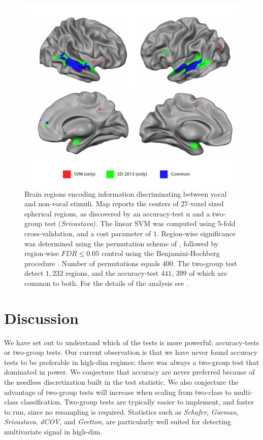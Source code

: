 \documentclass[oupdraft]{bio}
\begin{document}
\begin{figure}[th]
	\centering
	\includegraphics[width=0.5\columnwidth]{"art/svm_vs_SD"}
	\caption{\footnotesize
		Brain regions encoding information discriminating between vocal and non-vocal stimuli.
		Map reports the centers of $27$-voxel sized spherical regions, as discovered by an accuracy-test u and a two-group test (\emph{Srivastava}). 
		The linear SVM was computed using $5$-fold cross-validation, and a cost parameter of $1$. 
		Region-wise significance was determined using the permutation scheme of \cite{stelzer_statistical_2013}, followed by region-wise $FDR \leq 0.05$ control using the Benjamini-Hochberg procedure \citep{benjamini_controlling_1995}.
		Number of permutations equals $400$.
		The two-group test detect $1,232$ regions, and the accuracy-test $441$, $399$ of which are common to both.
		For the details of the analysis see \cite{gilron_quantifying_2016}.  
	}
	\label{fig:read_data}
\end{figure}








\section{Discussion}
\label{sec:discussion}

We have set out to understand which of the tests is more powerful: accuracy-tests or two-group tests. 
Our current observation is that we have never found accuracy tests to be preferable in high-dim regimes; there was always a two-group test that dominated in power.
We conjecture that accuracy are never preferred because of the needless discretization built in the test statistic.
We also conjecture the advantage of two-group tests will increase when scaling from two-class to multi-class classification.
Two-group tests are typically easier to implement, and faster to run, since no resampling is required. 
Statistics such as \emph{Schafer}, \emph{Goeman}, \emph{Srivastava}, \emph{dCOV}, and \emph{Gretton}, are particularly well suited for detecting multivariate signal in high-dim.
\end{document}
